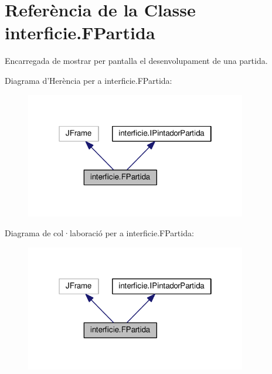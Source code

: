 \hypertarget{classinterficie_1_1_f_partida}{\section{Referència de la Classe interficie.\+F\+Partida}
\label{classinterficie_1_1_f_partida}
}


Encarregada de mostrar per pantalla el desenvolupament de una partida.  




Diagrama d'Herència per a interficie.\+F\+Partida\+:\nopagebreak
\begin{figure}[H]
\begin{center}
\leavevmode
\includegraphics[width=274pt]{classinterficie_1_1_f_partida__inherit__graph}
\end{center}
\end{figure}


Diagrama de col·laboració per a interficie.\+F\+Partida\+:\nopagebreak
\begin{figure}[H]
\begin{center}
\leavevmode
\includegraphics[width=274pt]{classinterficie_1_1_f_partida__coll__graph}
\end{center}
\end{figure}
